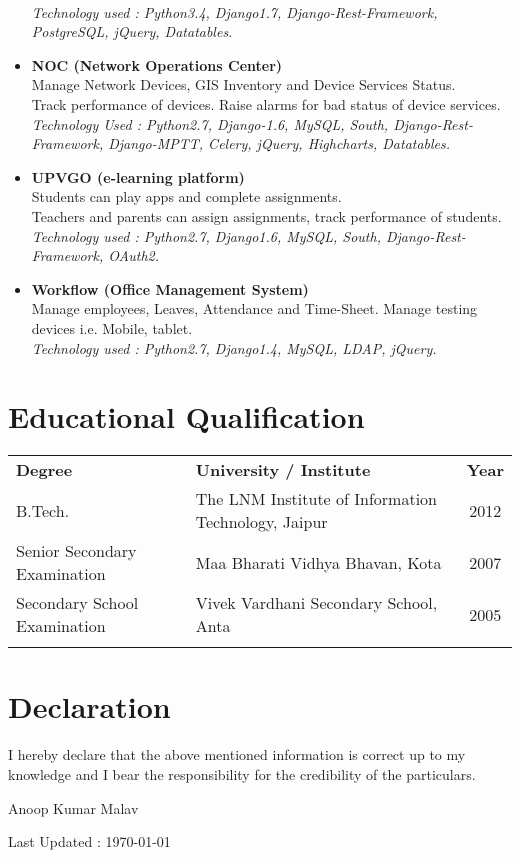 \documentclass[11pt]{article}
\begin{document}
\begin{itemize}
    \\ \textit{Technology used : Python3.4, Django1.7, Django-Rest-Framework, PostgreSQL, jQuery, Datatables.}
 \item \textbf{NOC (Network Operations Center)}
    \\ Manage Network Devices, GIS Inventory and Device Services Status.
    \\ Track performance of devices. Raise alarms for bad status of device services.
    \\ \textit{Technology Used : Python2.7, Django-1.6, MySQL, South, Django-Rest-Framework, Django-MPTT, Celery, jQuery, Highcharts, Datatables.}
 \item \textbf{UPVGO (e-learning platform)}
    \\ Students can play apps and complete assignments.
    \\ Teachers and parents can assign assignments, track performance of students.
    \\ \textit{Technology used : Python2.7, Django1.6, MySQL, South, Django-Rest-Framework, OAuth2.}
 \item \textbf{Workflow (Office Management System)}
    \\ Manage employees, Leaves, Attendance and Time-Sheet. Manage testing devices i.e. Mobile, tablet.
    \\ \textit{Technology used : Python2.7, Django1.4, MySQL, LDAP, jQuery.}
\end{itemize}

\section*{Educational Qualification}
\begin{tabular}{l l c }
\textbf{Degree} & \textbf{University / Institute} & \textbf{Year}\\[0.2cm]
B.Tech. & The LNM Institute of Information Technology, Jaipur & 2012\\[0.2cm]
Senior Secondary Examination & Maa Bharati Vidhya Bhavan, Kota & 2007\\[0.2cm]
Secondary School Examination & Vivek Vardhani Secondary School, Anta & 2005\\
 & & \\
\end{tabular}

\section*{Declaration}
I hereby declare that the above mentioned information is correct up to
my knowledge and I bear the responsibility for the credibility of the particulars.\\
\begin{flushright}
 Anoop Kumar Malav
\end{flushright}

\vfill

\begin{center}

Last Updated : \today

\end{center}
\end{document}

